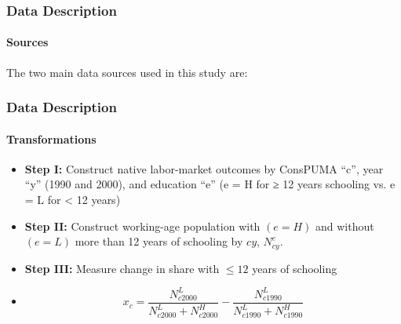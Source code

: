 
\begin{frame}
    \frametitle{Data Description}
    \framesubtitle{Sources}
    The two main data sources used in this study are:
\end{frame}

\begin{frame}
    \frametitle{Data Description}
    \framesubtitle{Transformations}
    \begin{itemize}
        \item \textbf{Step I:} Construct native labor-market outcomes by ConsPUMA “c”, year “y” (1990 and 2000), and education “e” (e = H for ≥ 12 years schooling vs. e = L for < 12 years)
    \end{itemize}
    \begin{itemize}
        \item \textbf{Step II:} Construct working-age population with $(e = H)$ and without $(e = L)$ more than 12 years of schooling by $cy$, $N^e_{cy}$.
    \end{itemize}
    \begin{itemize}
        \item \textbf{Step III:} Measure change in share with $\leq 12$ years of schooling
        \item \[x_c = \frac{N^L_{c2000}}{N^L_{c2000} + N^H_{c2000}} - \frac{N^L_{c1990}}{N^L_{c1990} + N^H_{c1990}}\]
    \end{itemize}
\end{frame}

